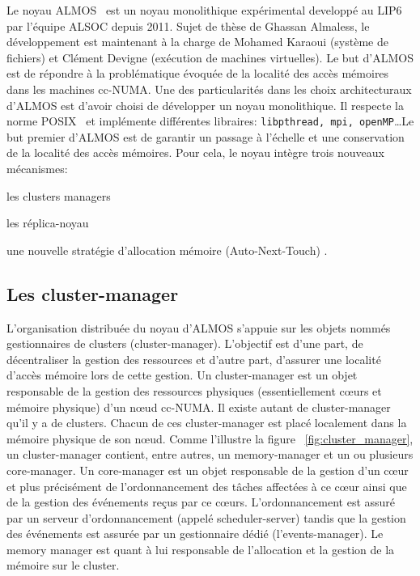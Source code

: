     Le noyau ALMOS~\cite{almaless2011almos} est un noyau monolithique
    expérimental developpé au LIP6 par l'équipe ALSOC depuis 2011. Sujet de
    thèse de Ghassan Almaless, le développement est maintenant à la charge de
    Mohamed Karaoui (système de fichiers) et Clément Devigne (exécution de
    machines virtuelles). Le but d'ALMOS est de répondre à la problématique
    évoquée de la localité des accès mémoires dans les machines cc-NUMA. Une des
    particularités dans les choix architecturaux d'ALMOS est d'avoir choisi de
    développer un noyau monolithique. Il respecte la norme
    POSIX~\cite{posix2013} et implémente différentes libraires:
    \texttt{libpthread, mpi, openMP}\ldots Le but premier d'ALMOS est de
    garantir un passage à l'échelle et une conservation de la localité des accès
    mémoires. Pour cela, le noyau intègre trois nouveaux mécanismes:
    \benumline \item les clusters managers \item les réplica-noyau \item une
    nouvelle stratégie d'allocation mémoire (Auto-Next-Touch) \eenumline.

    
    \subsection{Les cluster-manager}

      L'organisation distribuée du noyau d’ALMOS s’appuie sur les objets nommés
      gestionnaires de clusters (cluster-manager). L’objectif est d’une part, de
      décentraliser la gestion des ressources et d’autre part, d’assurer une
      localité d’accès mémoire lors de cette gestion. Un cluster-manager est un
      objet responsable de la gestion des ressources physiques (essentiellement
      c\oe urs et mémoire physique) d’un nœud cc-NUMA. Il existe autant de
      cluster-manager qu’il y a de clusters. Chacun de ces cluster-manager est
      placé localement dans la mémoire physique de son n\oe ud. Comme l'illustre
      la figure ~\ref{fig:cluster_manager}, un cluster-manager contient, entre
      autres, un memory-manager et un ou plusieurs core-manager.  Un
      core-manager est un objet responsable de la gestion d’un c\oe ur et plus
      précisément de l'ordonnancement des tâches affectées à ce c\oe ur ainsi
      que de la gestion des événements reçus par ce c\oe urs. L'ordonnancement
      est assuré par un serveur d'ordonnancement (appelé scheduler-server)
      tandis que la gestion des événements est assurée par un gestionnaire dédié
      (l'events-manager). Le memory manager est quant à lui responsable de
      l'allocation et la gestion de la mémoire sur le cluster.

